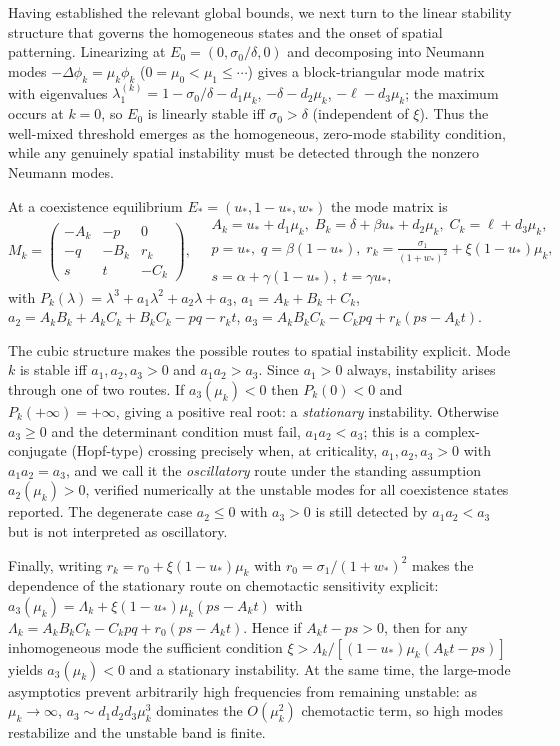 \documentclass[]{interact}
\theoremstyle{plain}%
\theoremstyle{definition}
\theoremstyle{remark}
\begin{document}
Having established the relevant global bounds, we next turn to the linear
stability structure that governs the homogeneous states and the onset of
spatial patterning. Linearizing at
$E_0=(0,\sigma_0/\delta,0)$ and decomposing into Neumann modes
$-\Delta\phi_k=\mu_k\phi_k$ ($0=\mu_0<\mu_1\le\cdots$) gives a block-triangular
mode matrix with eigenvalues
$\lambda_1^{(k)}=1-\sigma_0/\delta-d_1\mu_k$, $-\delta-d_2\mu_k$,
$-\ell-d_3\mu_k$; the maximum occurs at $k=0$, so $E_0$ is linearly stable iff
$\sigma_0>\delta$ (independent of $\xi$). Thus the well-mixed threshold emerges
as the homogeneous, zero-mode stability condition, while any genuinely spatial
instability must be detected through the nonzero Neumann modes.

At a coexistence equilibrium
$E_*=(u_*,1-u_*,w_*)$ the mode matrix is
\[
M_k=\begin{pmatrix}-A_k&-p&0\\ -q&-B_k&r_k\\ s&t&-C_k\end{pmatrix},\quad
\begin{array}{l}
A_k=u_*+d_1\mu_k,\;B_k=\delta+\beta u_*+d_2\mu_k,\;C_k=\ell+d_3\mu_k,\\
p=u_*,\;q=\beta(1-u_*),\;r_k=\tfrac{\sigma_1}{(1+w_*)^2}+\xi(1-u_*)\mu_k,\\
s=\alpha+\gamma(1-u_*),\;t=\gamma u_*,
\end{array}
\]
with $P_k(\lambda)=\lambda^3+a_1\lambda^2+a_2\lambda+a_3$,
$a_1=A_k+B_k+C_k$, $a_2=A_kB_k+A_kC_k+B_kC_k-pq-r_kt$,
$a_3=A_kB_kC_k-C_kpq+r_k(ps-A_kt)$.

The cubic structure makes the possible routes to spatial instability explicit.
Mode $k$ is stable iff $a_1,a_2,a_3>0$ and $a_1a_2>a_3$. Since $a_1>0$ always,
instability arises through one of two routes. If $a_3(\mu_k)<0$ then $P_k(0)<0$
and $P_k(+\infty)=+\infty$, giving a positive real root: a \emph{stationary}
instability. Otherwise $a_3\ge0$ and the determinant condition must fail,
$a_1a_2<a_3$; this is a complex-conjugate (Hopf-type) crossing precisely when, at
criticality, $a_1,a_2,a_3>0$ with $a_1a_2=a_3$, and we call it the
\emph{oscillatory} route under the standing assumption $a_2(\mu_k)>0$, verified
numerically at the unstable modes for all coexistence states reported. The
degenerate case $a_2\le0$ with $a_3>0$ is still detected by $a_1a_2<a_3$ but is
not interpreted as oscillatory.

Finally, writing $r_k=r_0+\xi(1-u_*)\mu_k$ with
$r_0=\sigma_1/(1+w_*)^2$ makes the dependence of the stationary route on
chemotactic sensitivity explicit:
$a_3(\mu_k)=\Lambda_k+\xi(1-u_*)\mu_k(ps-A_kt)$ with
$\Lambda_k=A_kB_kC_k-C_kpq+r_0(ps-A_kt)$. Hence if $A_kt-ps>0$, then for any
inhomogeneous mode the sufficient condition
$\xi>\Lambda_k/[(1-u_*)\mu_k(A_kt-ps)]$ yields $a_3(\mu_k)<0$ and a stationary
instability. At the same time, the large-mode asymptotics prevent arbitrarily
high frequencies from remaining unstable: as $\mu_k\to\infty$,
$a_3\sim d_1d_2d_3\mu_k^3$ dominates the $O(\mu_k^2)$ chemotactic term, so
high modes restabilize and the unstable band is finite.
\end{document}
